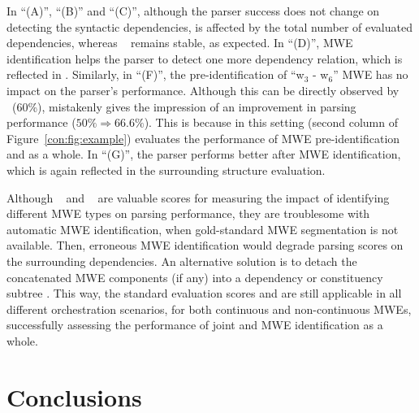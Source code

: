 \documentclass[output=paper]{langsci/langscibook}
\begin{document}
In ``(A)'', ``(B)'' and ``(C)'', although the parser success does not change on detecting the syntactic dependencies, \asuo{} is affected by the total number of evaluated dependencies, whereas \asus~ remains stable, as expected.
In ``(D)'', MWE identification helps the parser to detect one more dependency relation, which is reflected in \asus{}.
Similarly, in ``(F)'', the pre-identification of  ``w$_3$ - w$_6$'' MWE has no impact on the parser's performance.
Although this can be directly observed by \asus~(60\%), \asuo{} mistakenly gives the impression of an improvement in parsing performance ($50\%\Rightarrow66.6\%$). This is because  in this setting (second column of Figure~\ref{con:fig:example})
\asuo{} evaluates the performance of MWE pre-identification and  as a whole.
In ``(G)'', the parser performs better after MWE identification, which is again reflected in the surrounding structure evaluation.

Although \asus~ and \asls~ are valuable scores for measuring the impact of identifying different MWE types on parsing performance, they are troublesome with automatic MWE identification, when gold-standard MWE segmentation is not available. Then, erroneous MWE identification would degrade parsing scores on the surrounding dependencies.
An alternative solution is to detach the concatenated MWE components (if any) into a dependency or constituency subtree \citep{candito2014strategies,eryigit:2011:multiword}. This way, the standard evaluation scores \asu{} and \asl{} are still applicable in all different orchestration scenarios, for both continuous and non-continuous MWEs, successfully assessing the performance of joint  and MWE identification as a whole.

%
\section{Conclusions}
\label{con:sec:conclusions}
\end{document}
